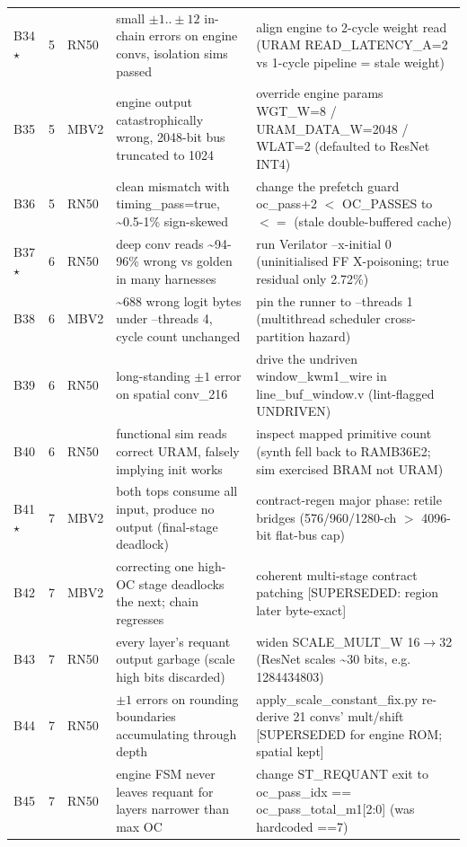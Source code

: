 \begin{footnotesize}
\begin{longtable}{@{}l l l p{} p{}@{}}
B34 $\star$ & 5 & RN50 & small $\pm1..\pm12$ in-chain errors on engine convs, isolation sims passed & align engine to 2-cycle weight read (URAM READ\_LATENCY\_A=2 vs 1-cycle pipeline = stale weight) \\
B35 & 5 & MBV2 & engine output catastrophically wrong, 2048-bit bus truncated to 1024 & override engine params WGT\_W=8 / URAM\_DATA\_W=2048 / WLAT=2 (defaulted to ResNet INT4) \\
B36 & 5 & RN50 & clean mismatch with timing\_pass=true, \textasciitilde{}0.5-1\% sign-skewed & change the prefetch guard oc\_pass+2 $<$ OC\_PASSES to $<=$ (stale double-buffered cache) \\
B37 $\star$ & 6 & RN50 & deep conv reads \textasciitilde{}94-96\% wrong vs golden in many harnesses & run Verilator --x-initial 0 (uninitialised FF X-poisoning; true residual only 2.72\%) \\
B38 & 6 & MBV2 & \textasciitilde{}688 wrong logit bytes under --threads 4, cycle count unchanged & pin the runner to --threads 1 (multithread scheduler cross-partition hazard) \\
B39 & 6 & RN50 & long-standing $\pm1$ error on spatial conv\_216 & drive the undriven window\_kwm1\_wire in line\_buf\_window.v (lint-flagged UNDRIVEN) \\
B40 & 6 & RN50 & functional sim reads correct URAM, falsely implying init works & inspect mapped primitive count (synth fell back to RAMB36E2; sim exercised BRAM not URAM) \\
B41 $\star$ & 7 & MBV2 & both tops consume all input, produce no output (final-stage deadlock) & contract-regen major phase: retile bridges (576/960/1280-ch $>$ 4096-bit flat-bus cap) \\
B42 & 7 & MBV2 & correcting one high-OC stage deadlocks the next; chain regresses & coherent multi-stage contract patching [SUPERSEDED: region later byte-exact] \\
B43 & 7 & RN50 & every layer's requant output garbage (scale high bits discarded) & widen SCALE\_MULT\_W 16$\rightarrow$32 (ResNet scales \textasciitilde{}30 bits, e.g. 1284434803) \\
B44 & 7 & RN50 & $\pm1$ errors on rounding boundaries accumulating through depth & apply\_scale\_constant\_fix.py re-derive 21 convs' mult/shift [SUPERSEDED for engine ROM; spatial kept] \\
B45 & 7 & RN50 & engine FSM never leaves requant for layers narrower than max OC & change ST\_REQUANT exit to oc\_pass\_idx == oc\_pass\_total\_m1[2:0] (was hardcoded ==7) \\

\end{longtable}
\end{footnotesize}
